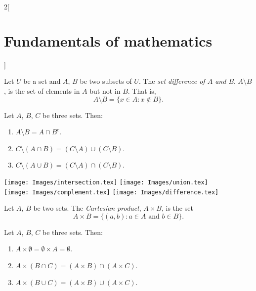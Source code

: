 \documentclass[../../../main.tex]{subfiles}
\begin{document}
\begin{multicols}{2}[\section{Fundamentals of mathematics}]
\begin{prop}
\begin{enumerate}
        \end{enumerate}
    \end{prop}
    \begin{definition}
        Let $U$ be a set and $A$, $B$ be two subsets of $U$. The \textit{set difference of $A$ and $B$}, $A\setminus B$, is the set of elements in $A$ but not in $B$. That is, $$A\setminus B=\{x\in A:x\notin B\}.$$
    \end{definition}
    \begin{prop}
        Let $A$, $B$, $C$ be three sets. Then:
        \begin{enumerate}
            \item $A\setminus B=A\cap B^c$.
            \item $C\setminus(A\cap B)=(C\setminus A)\cup (C\setminus B)$.
            \item $C\setminus(A\cup B)=(C\setminus A)\cap (C\setminus B)$.
        \end{enumerate}
    \end{prop}
    \begin{center}
        \texttt{[image: Images/intersection.tex]}\hfill
        \texttt{[image: Images/union.tex]}\\
        \vspace{0.02\linewidth}
        \texttt{[image: Images/complement.tex]}\hfill
        \texttt{[image: Images/difference.tex]}
    \end{center}
    \begin{definition}
        Let $A$, $B$ be two sets. The \textit{Cartesian product}, $A\times B$, is the set $$A\times B=\{(a,b): a\in A\text{ and }b\in B\}.$$
    \end{definition}
    \begin{prop}
        Let $A$, $B$, $C$ be three sets. Then:
        \begin{enumerate}
            \item $A\times \emptyset=\emptyset\times A=\emptyset$.
            \item $A\times(B\cap C)=(A\times B)\cap(A\times C)$.
            \item $A\times(B\cup C)=(A\times B)\cup(A\times C)$.
        \end{enumerate}
    \end{prop}

\end{multicols}
\end{document}
